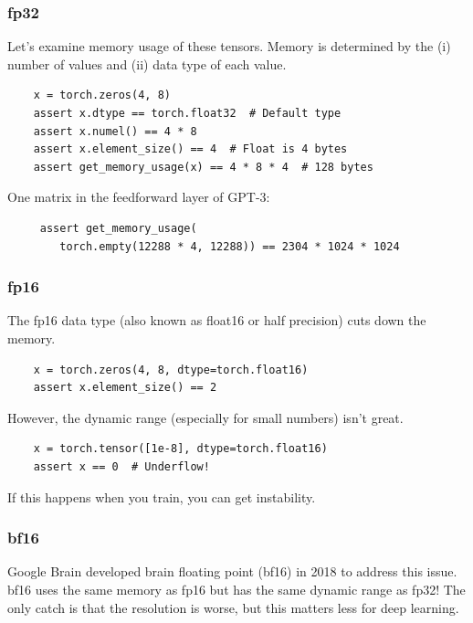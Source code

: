 \documentclass[12pt,twoside]{article}
\begin{document}
\subsubsection*{fp32}

Let's examine memory usage of these tensors. Memory is determined by the (i) number of values and (ii) data type of each value.

\begin{verbatim}
    x = torch.zeros(4, 8)  
    assert x.dtype == torch.float32  # Default type
    assert x.numel() == 4 * 8
    assert x.element_size() == 4  # Float is 4 bytes
    assert get_memory_usage(x) == 4 * 8 * 4  # 128 bytes
\end{verbatim}

One matrix in the feedforward layer of GPT-3:

\begin{verbatim}
     assert get_memory_usage(
        torch.empty(12288 * 4, 12288)) == 2304 * 1024 * 1024
\end{verbatim}

\subsubsection*{fp16}

The fp16 data type (also known as float16 or half precision) cuts down the memory.

\begin{verbatim}
    x = torch.zeros(4, 8, dtype=torch.float16)  
    assert x.element_size() == 2
\end{verbatim}

However, the dynamic range (especially for small numbers) isn't great.

\begin{verbatim}
    x = torch.tensor([1e-8], dtype=torch.float16)  
    assert x == 0  # Underflow!
\end{verbatim}

If this happens when you train, you can get instability.

\subsubsection*{bf16}

Google Brain developed brain floating point (bf16) in 2018 to address this issue. bf16 uses the same memory as fp16 but has the same dynamic range as fp32! The only catch is that the resolution is worse, but this matters less for deep learning.
\end{document}
